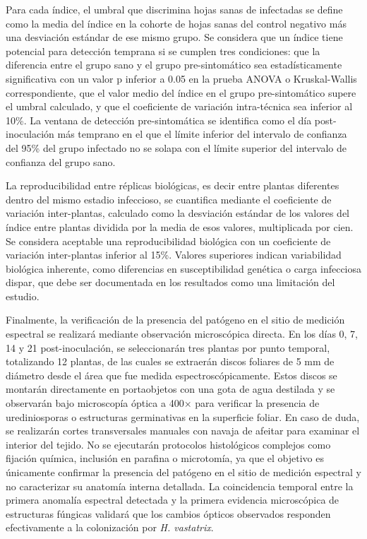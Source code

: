 \documentclass[12pt, a4paper]{article}
\begin{document}
	Para cada índice, el umbral que discrimina hojas sanas de infectadas se define como la media del índice en la cohorte de hojas sanas del control negativo más una desviación estándar de ese mismo grupo. Se considera que un índice tiene potencial para detección temprana si se cumplen tres condiciones: que la diferencia entre el grupo sano y el grupo pre-sintomático sea estadísticamente significativa con un valor p inferior a 0.05 en la prueba ANOVA o Kruskal-Wallis correspondiente, que el valor medio del índice en el grupo pre-sintomático supere el umbral calculado, y que el coeficiente de variación intra-técnica sea inferior al 10\%. La ventana de detección pre-sintomática se identifica como el día post-inoculación más temprano en el que el límite inferior del intervalo de confianza del 95\% del grupo infectado no se solapa con el límite superior del intervalo de confianza del grupo sano.
	
	La reproducibilidad entre réplicas biológicas, es decir entre plantas diferentes dentro del mismo estadio infeccioso, se cuantifica mediante el coeficiente de variación inter-plantas, calculado como la desviación estándar de los valores del índice entre plantas dividida por la media de esos valores, multiplicada por cien. Se considera aceptable una reproducibilidad biológica con un coeficiente de variación inter-plantas inferior al 15\%. Valores superiores indican variabilidad biológica inherente, como diferencias en susceptibilidad genética o carga infecciosa dispar, que debe ser documentada en los resultados como una limitación del estudio.
	
	Finalmente, la verificación de la presencia del patógeno en el sitio de medición espectral se realizará mediante observación microscópica directa. En los días 0, 7, 14 y 21 post-inoculación, se seleccionarán tres plantas por punto temporal, totalizando 12 plantas, de las cuales se extraerán discos foliares de 5 mm de diámetro desde el área que fue medida espectroscópicamente. Estos discos se montarán directamente en portaobjetos con una gota de agua destilada y se observarán bajo microscopía óptica a 400× para verificar la presencia de urediniosporas o estructuras germinativas en la superficie foliar. En caso de duda, se realizarán cortes transversales manuales con navaja de afeitar para examinar el interior del tejido. No se ejecutarán protocolos histológicos complejos como fijación química, inclusión en parafina o microtomía, ya que el objetivo es únicamente confirmar la presencia del patógeno en el sitio de medición espectral y no caracterizar su anatomía interna detallada. La coincidencia temporal entre la primera anomalía espectral detectada y la primera evidencia microscópica de estructuras fúngicas validará que los cambios ópticos observados responden efectivamente a la colonización por \textit{H. vastatrix}.
	
\end{document}
